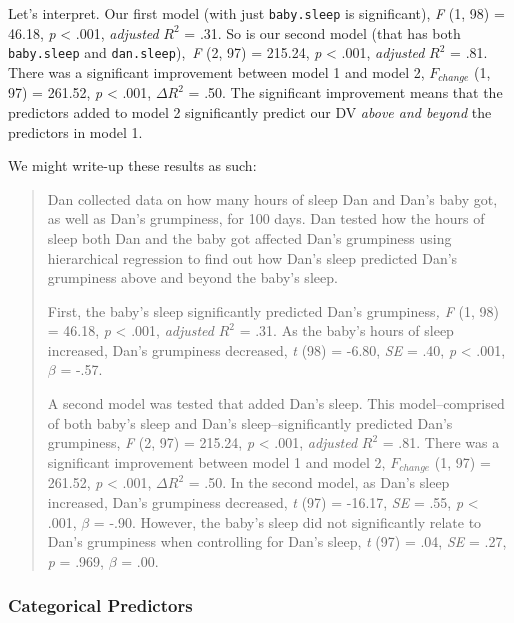 \documentclass[
]{book}
\begin{document}
Let's interpret. Our first model (with just \texttt{baby.sleep} is significant), \emph{F} (1, 98) = 46.18, \emph{p} \textless{} .001, \emph{adjusted} \(R^2\) = .31. So is our second model (that has both \texttt{baby.sleep} and \texttt{dan.sleep}),~\emph{F} (2, 97) = 215.24, \emph{p} \textless{} .001, \emph{adjusted} \(R^2\) = .81. There was a significant improvement between model 1 and model 2, \(F_{change}\) (1, 97) = 261.52, \emph{p} \textless{} .001, \(\Delta R^2\) = .50. The significant improvement means that the predictors added to model 2 significantly predict our DV \emph{above and beyond} the predictors in model 1.

We might write-up these results as such:

\begin{quote}
Dan collected data on how many hours of sleep Dan and Dan's baby got, as well as Dan's grumpiness, for 100 days. Dan tested how the hours of sleep both Dan and the baby got affected Dan's grumpiness using hierarchical regression to find out how Dan's sleep predicted Dan's grumpiness above and beyond the baby's sleep.

First, the baby's sleep significantly predicted Dan's grumpiness\emph{, F} (1, 98) = 46.18, \emph{p} \textless{} .001, \emph{adjusted} \(R^2\) = .31. As the baby's hours of sleep increased, Dan's grumpiness decreased, \emph{t} (98) = -6.80, \emph{SE} = .40, \emph{p} \textless{} .001, \(\beta\) = -.57.

A second model was tested that added Dan's sleep. This model--comprised of both baby's sleep and Dan's sleep--significantly predicted Dan's grumpiness, \emph{F} (2, 97) = 215.24, \emph{p} \textless{} .001, \emph{adjusted} \(R^2\) = .81. There was a significant improvement between model 1 and model 2, \(F_{change}\) (1, 97) = 261.52, \emph{p} \textless{} .001, \(\Delta R^2\) = .50. In the second model, as Dan's sleep increased, Dan's grumpiness decreased, \emph{t} (97) = -16.17, \emph{SE} = .55, \emph{p} \textless{} .001, \(\beta\) = -.90. However, the baby's sleep did not significantly relate to Dan's grumpiness when controlling for Dan's sleep, \emph{t} (97) = .04, \emph{SE} = .27, \emph{p} = .969, \(\beta\) = .00.
\end{quote}

\hypertarget{categorical-predictors}{%
\subsubsection{Categorical Predictors}\label{categorical-predictors}}
\end{document}
